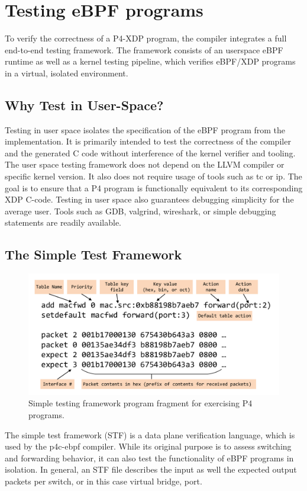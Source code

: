 \section{Testing eBPF programs}\label{sec:testing}
To verify the correctness of a P4-XDP program, the compiler integrates a full
end-to-end testing framework. The framework consists of an userspace eBPF
runtime as well as a kernel testing pipeline, which verifies eBPF/XDP programs
in a virtual, isolated environment.

\subsection{Why Test in User-Space?}
Testing in user space isolates the specification of the eBPF program from the
implementation. It is primarily intended to test the correctness of the
compiler and the generated C code without interference of the kernel verifier
and tooling. The user space testing framework does not depend on the LLVM
compiler or specific kernel version. It also does not require usage of tools
such as tc or ip. The goal is to ensure that a P4 program is functionally
equivalent to its corresponding XDP C-code.
Testing in user space also guarantees debugging simplicity for the average
user. Tools such as GDB, valgrind, wireshark, or simple debugging statements
are readily available.

\subsection{The Simple Test Framework}
\begin{figure}
	\centering
	\includegraphics[width=\linewidth]{stf}
	\caption{Simple testing framework program fragment for exercising P4 programs.}
	\label{fig:stf}
\end{figure}
The simple test framework (STF) is a data plane verification language, which is
used by the p4c-ebpf compiler. While its original purpose is to assess
switching and
forwarding behavior, it can also test the functionality of eBPF programs in
isolation.
In general, an STF file describes the input as well the expected output
packets per switch, or in this case virtual bridge, port.

